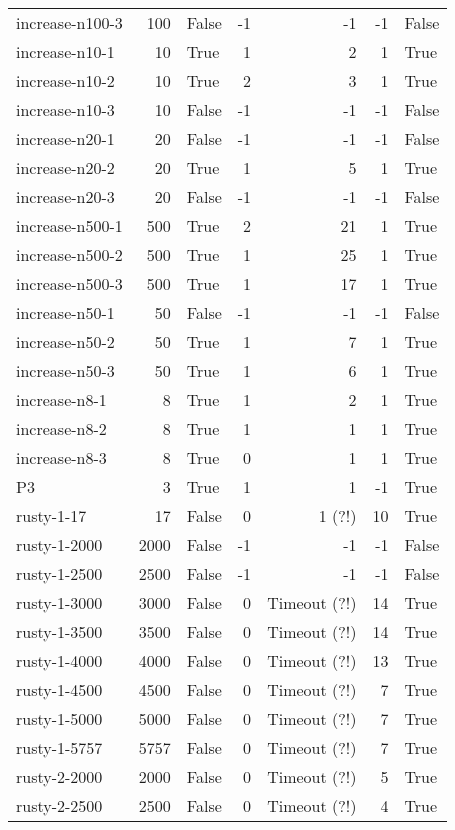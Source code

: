 \begin{longtable}{lrlrrrl}
increase-n100-3 & 100 & False & -1 & -1 & -1 & False \\
increase-n10-1 & 10 & True & 1 & 2 & 1 & True \\
increase-n10-2 & 10 & True & 2 & 3 & 1 & True \\
increase-n10-3 & 10 & False & -1 & -1 & -1 & False \\
increase-n20-1 & 20 & False & -1 & -1 & -1 & False \\
increase-n20-2 & 20 & True & 1 & 5 & 1 & True \\
increase-n20-3 & 20 & False & -1 & -1 & -1 & False \\
increase-n500-1 & 500 & True & 2 & 21 & 1 & True \\
increase-n500-2 & 500 & True & 1 & 25 & 1 & True \\
increase-n500-3 & 500 & True & 1 & 17 & 1 & True \\
increase-n50-1 & 50 & False & -1 & -1 & -1 & False \\
increase-n50-2 & 50 & True & 1 & 7 & 1 & True \\
increase-n50-3 & 50 & True & 1 & 6 & 1 & True \\
increase-n8-1 & 8 & True & 1 & 2 & 1 & True \\
increase-n8-2 & 8 & True & 1 & 1 & 1 & True \\
increase-n8-3 & 8 & True & 0 & 1 & 1 & True \\
P3 & 3 & True & 1 & 1 & -1 & True \\
rusty-1-17 & 17 & False & 0 & 1 (?!) & 10 & True \\
rusty-1-2000 & 2000 & False & -1 & -1 & -1 & False \\
rusty-1-2500 & 2500 & False & -1 & -1 & -1 & False \\
rusty-1-3000 & 3000 & False & 0 & Timeout (?!) & 14 & True \\
rusty-1-3500 & 3500 & False & 0 & Timeout (?!) & 14 & True \\
rusty-1-4000 & 4000 & False & 0 & Timeout (?!) & 13 & True \\
rusty-1-4500 & 4500 & False & 0 & Timeout (?!) & 7 & True \\
rusty-1-5000 & 5000 & False & 0 & Timeout (?!) & 7 & True \\
rusty-1-5757 & 5757 & False & 0 & Timeout (?!) & 7 & True \\
rusty-2-2000 & 2000 & False & 0 & Timeout (?!) & 5 & True \\
rusty-2-2500 & 2500 & False & 0 & Timeout (?!) & 4 & True \\

\end{longtable}
